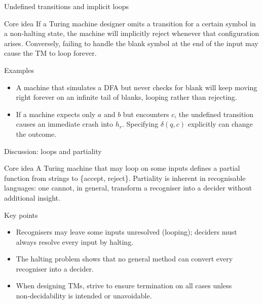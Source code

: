 \begin{frame}[t]{Undefined transitions and implicit loops}
  \begin{tblock}{Core idea}
    If a Turing machine designer omits a transition for a certain
    symbol in a non‑halting state, the machine will implicitly reject
    whenever that configuration arises.  Conversely, failing to handle
    the blank symbol at the end of the input may cause the TM to loop
    forever.
  \end{tblock}
  \begin{tblock}{Examples}
    \begin{itemize}
      \item A machine that simulates a DFA but never checks for blank
        will keep moving right forever on an infinite tail of blanks,
        looping rather than rejecting.
      \item If a machine expects only $a$ and $b$ but encounters $c$,
        the undefined transition causes an immediate crash into $h_r$.
        Specifying $\delta(q,c)$ explicitly can change the outcome.
    \end{itemize}
  \end{tblock}
  \label{fr:7.2-18}
\end{frame}

\begin{frame}[t]{Discussion: loops and partiality}
  \begin{tblock}{Core idea}
    A Turing machine that may loop on some inputs defines a partial
    function from strings to \{accept, reject\}.  Partiality is
    inherent in recognisable languages: one cannot, in general,
    transform a recogniser into a decider without additional insight.
  \end{tblock}
  \begin{tblock}{Key points}
    \begin{itemize}
      \item Recognisers may leave some inputs unresolved (looping);
        deciders must always resolve every input by halting.
      \item The halting problem shows that no general method can
        convert every recogniser into a decider.
      \item When designing TMs, strive to ensure termination on all
        cases unless non‑decidability is intended or unavoidable.
    \end{itemize}
  \end{tblock}
  \label{fr:7.2-19}
\end{frame}

